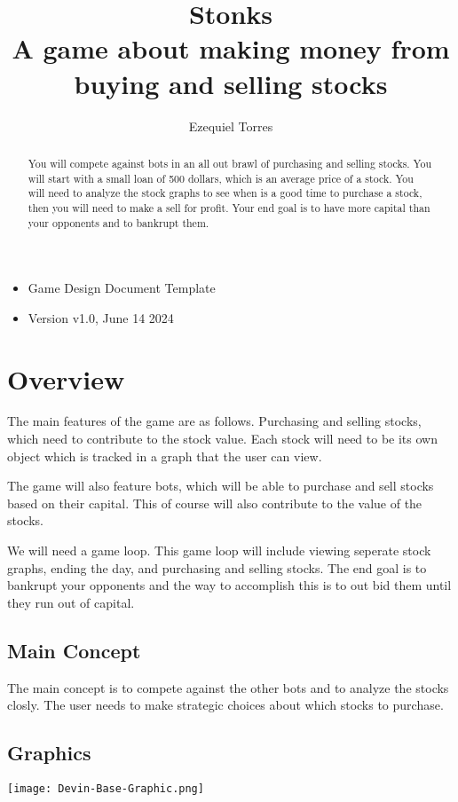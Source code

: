\documentclass{report}
\title{Stonks \large \\
A game about making money from buying and selling stocks}
\author{Ezequiel Torres}
\begin{document}
\maketitle 
\begin{itemize}
    \item Game Design Document Template
    \item Version v1.0, June 14 2024\\
\end{itemize}
\newpage

\begin{abstract}
You will compete against bots in an all out brawl of purchasing and selling stocks. You will start with a small loan of 500 dollars, which is an average price of a stock. You will need to analyze the stock graphs to see when is a good time to purchase a stock, then you will need to make a sell for profit. Your end goal is to have more capital than your opponents and to bankrupt them.
\end{abstract}

\tableofcontents

\chapter{Overview}

The main features of the game are as follows. Purchasing and selling stocks, which need to contribute to the stock value. Each stock will need to be its own object which is tracked in a graph that the user can view. 

The game will also feature bots, which will be able to purchase and sell stocks based on their capital. This of course will also contribute to the value of the stocks. 

We will need a game loop. This game loop will include viewing seperate stock graphs, ending the day, and purchasing and selling stocks. The end goal is to bankrupt your opponents and the way to accomplish this is to out bid them until they run out of capital. 

\section{Main Concept}
The main concept is to compete against the other bots and to analyze the stocks closly. The user needs to make strategic choices about which stocks to purchase.


\section{Graphics}
\texttt{[image: Devin-Base-Graphic.png]}
\end{document}
